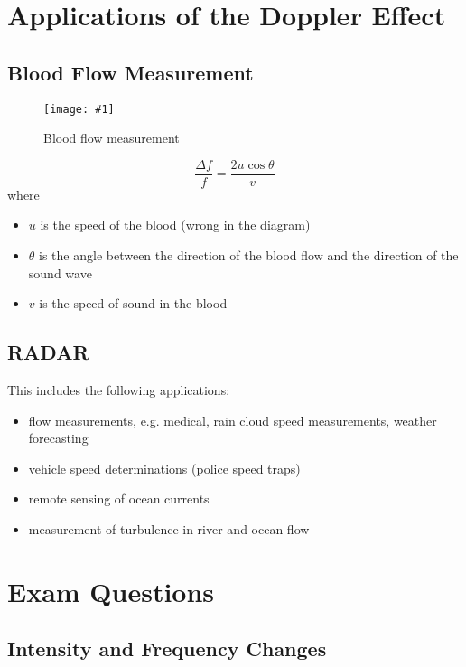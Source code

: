 \documentclass[a4paper,12pt]{article}
\let\oldsection\section
\renewcommand\section{\clearpage\oldsection}
\newcommand{\img}[4]{\begin{center}
  \begin{figure}[H]
    \centering
    \texttt{[image: \#1]}
    \caption{#3}
    \label{fig:#4}
  \end{figure}
\end{center}}
\begin{document}
\section{Applications of the Doppler Effect}

\subsection{Blood Flow Measurement}

\img{bloodvessel.png}{0.5}{Blood flow measurement}{bloodvessel}

\begin{equation}
  \frac{\Delta f}{f} = \frac{2u\cos\theta}{v}
\end{equation}
where
\begin{itemize}
  \item $u$ is the speed of the blood (wrong in the diagram)
  \item $\theta$ is the angle between the direction of the blood flow and the direction of the sound wave
  \item $v$ is the speed of sound in the blood
\end{itemize}

\pagebreak

\subsection{RADAR}

This includes the following applications:
\begin{itemize}
  \item flow measurements, e.g. medical, rain cloud speed measurements, weather forecasting
  \item vehicle speed determinations (police speed traps)
  \item remote sensing of ocean currents
  \item measurement of turbulence in river and ocean flow
\end{itemize}

\section{Exam Questions}

\subsection{Intensity and Frequency Changes}
\end{document}
